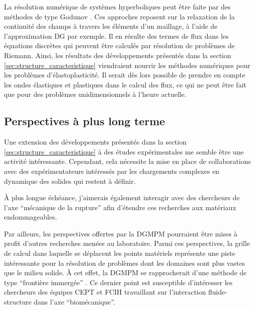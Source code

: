 La résolution numérique de systèmes hyperboliques peut être faite par des méthodes de type Godunov \cite{Godunov_method}.
%
Ces approches reposent sur la relaxation de la continuité des champs à travers les éléments d'un maillage, à l'aide de l'approximation DG par exemple.
Il en résulte des termes de flux dans les équations discrètes qui peuvent être calculés par résolution de problèmes de Riemann.
Ainsi, les résultats des développements présentés dans la section \ref{sec:structure_caracteristique} viendraient nourrir les méthodes numériques pour les problèmes d'élastoplasticité.
Il serait dès lors possible de prendre en compte les ondes élastiques et plastiques dans le calcul des flux, ce qui ne peut être fait que pour des problèmes unidimensionnels à l'heure actuelle.

\subsection{Perspectives à plus long terme}
\label{sec:perspective}

Une extension des développements présentés dans la section \ref{sec:structure_caracteristique} à des études expérimentales me semble être une activité intéressante.
Cependant, cela nécessite la mise en place de collaborations avec des expérimentateurs intéressés par les chargements complexes en dynamique des solides qui restent à définir.

{\`A} plus longue échéance, j'aimerais également interagir avec des chercheurs de l'axe ``mécanique de la rupture'' afin d'étendre ces recherches aux matériaux endommageables. 


Par ailleurs, les perspectives offertes par la DGMPM pourraient être mises à profit d'autres recherches menées au laboratoire.
Parmi ces perspectives, la grille de calcul dans laquelle se déplacent les points matériels représente une piste intéressante pour la résolution de problèmes dont les domaines sont plus vastes que le milieu solide. 
{\`A} cet effet, la DGMPM se rapprocherait d'une méthode de type ``frontière immergée'' \cite{IBM}. 
Ce dernier point est susceptible d'intéresser les chercheurs des équipes CEPT et FCIH travaillant sur l'interaction fluide-structure dans l'axe ``biomécanique''.

